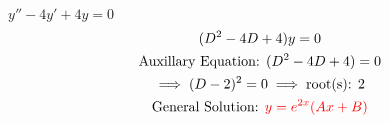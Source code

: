 \item [2.] $y''-4y'+4y=0$
\begin{gather*}
    (D^2-4D+4)y=0\\
    \text{Auxillary Equation: }(D^2-4D+4)=0\\
    \implies (D-2)^2=0 \implies \text{root(s): }2\\
    \text{General Solution: } \textcolor{red}{y=e^{2x}(Ax+B)}
\end{gather*}